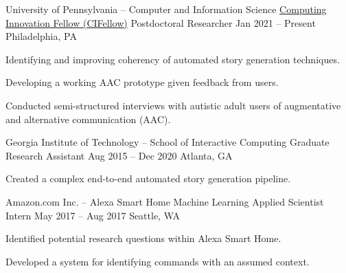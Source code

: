 {\color{black}\fontsize{12pt}{1em}} 


\begin{cventries}

  \cventry
    {University of Pennsylvania -- Computer and Information Science} %
    {\href{https://cifellows2020.org/}{Computing Innovation Fellow (CIFellow)} Postdoctoral Researcher} %
    {Jan 2021 – Present} %
    {Philadelphia, PA} %
    {
      \begin{cvitems} %
      \item {Identifying and improving coherency of automated story generation techniques.}
      \item {Developing a working AAC prototype given feedback from users.}
      \item {Conducted semi-structured interviews with autistic adult users of augmentative and alternative communication (AAC).}
      \end{cvitems}
    }
  \cventry
    {Georgia Institute of Technology -- School of Interactive Computing} %
    {Graduate Research Assistant} %
    {Aug 2015 – Dec 2020} %
    {Atlanta, GA} %
    {
      \begin{cvitems} %
        \item {Created a complex end-to-end automated story generation pipeline.}
      \end{cvitems}
    }

  \cventry
    {Amazon.com Inc. -- Alexa Smart Home Machine Learning} %
    {Applied Scientist Intern} %
    {May 2017 – Aug 2017} %
    {Seattle, WA} %
    {
      \begin{cvitems} %
        \item {Identified potential research questions within Alexa Smart Home.}
        \item {Developed a system for identifying commands with an assumed context.}
      \end{cvitems}
    }


\end{cventries}
